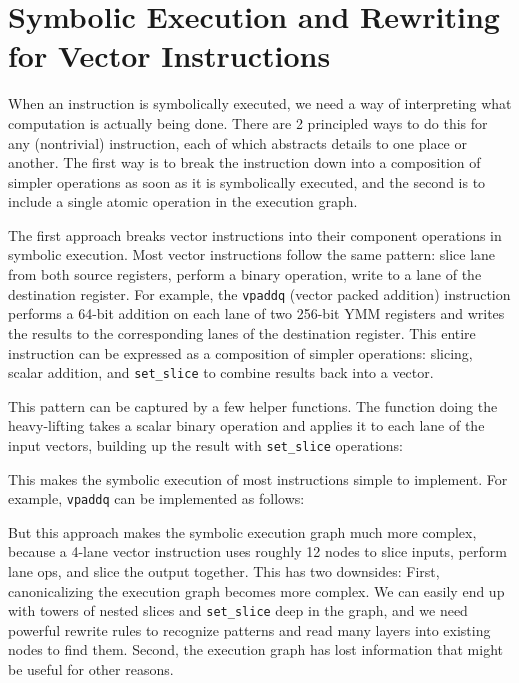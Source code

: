 \chapter{Symbolic Execution and Rewriting for Vector Instructions}
\label{ch:symex}

When an instruction is symbolically executed, we need a way of interpreting what computation is actually being done. There are 2 principled ways to do this for any (nontrivial) instruction, each of which abstracts details to one place or another. The first way is to break the instruction down into a composition of simpler operations as soon as it is symbolically executed, and the second is to include a single atomic operation in the execution graph.

The first approach breaks vector instructions into their component operations in symbolic execution. Most vector instructions follow the same pattern: slice lane from both source registers, perform a binary operation, write to a lane of the destination register. For example, the \verb|vpaddq| (vector packed addition) instruction performs a 64-bit addition on each lane of two 256-bit YMM registers and writes the results to the corresponding lanes of the destination register. This entire instruction can be expressed as a composition of simpler operations: slicing, scalar addition, and \verb|set_slice| to combine results back into a vector.

This pattern can be captured by a few helper functions. The function doing the heavy-lifting takes a scalar binary operation and applies it to each lane of the input vectors, building up the result with \verb|set_slice| operations:


This makes the symbolic execution of most instructions simple to implement. For example, \verb|vpaddq| can be implemented as follows:


But this approach makes the symbolic execution graph much more complex, because a 4-lane vector instruction uses roughly 12 nodes to slice inputs, perform lane ops, and slice the output together. This has two downsides:
First, canonicalizing the execution graph becomes more complex. We can easily end up with towers of nested slices and \verb|set_slice| deep in the graph, and we need powerful rewrite rules to recognize patterns and read many layers into existing nodes to find them.
Second, the execution graph has lost information that might be useful for other reasons. 


